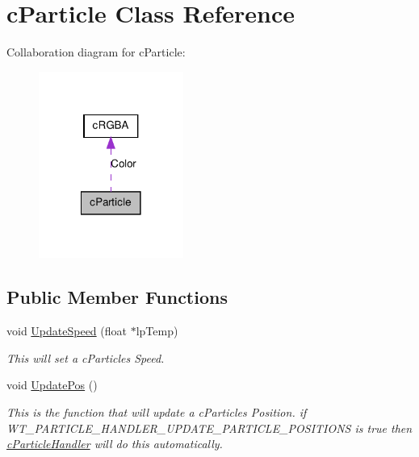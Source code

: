 \hypertarget{classc_particle}{
\section{cParticle Class Reference}
\label{classc_particle}
}


Collaboration diagram for cParticle:\nopagebreak
\begin{figure}[H]
\begin{center}
\leavevmode
\includegraphics[width=134pt]{classc_particle__coll__graph}
\end{center}
\end{figure}
\subsection*{Public Member Functions}
\begin{DoxyCompactItemize}
\item 
\hypertarget{classc_particle_a208780eb109c709449a2edd3f7867e51}{
void \hyperlink{classc_particle_a208780eb109c709449a2edd3f7867e51}{UpdateSpeed} (float $\ast$lpTemp)}
\label{classc_particle_a208780eb109c709449a2edd3f7867e51}

\begin{DoxyCompactList}\small\item\em This will set a cParticles Speed. \end{DoxyCompactList}\item 
\hypertarget{classc_particle_a029fe14e7b4a67e6a7864b86772b283b}{
void \hyperlink{classc_particle_a029fe14e7b4a67e6a7864b86772b283b}{UpdatePos} ()}
\label{classc_particle_a029fe14e7b4a67e6a7864b86772b283b}

\begin{DoxyCompactList}\small\item\em This is the function that will update a cParticles Position. if WT\_\-PARTICLE\_\-HANDLER\_\-UPDATE\_\-PARTICLE\_\-POSITIONS is true then \hyperlink{classc_particle_handler}{cParticleHandler} will do this automatically. \end{DoxyCompactList}\end{DoxyCompactItemize}
